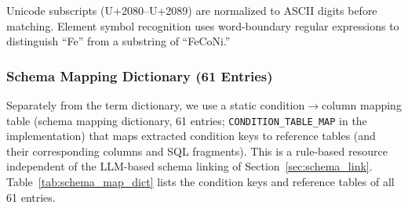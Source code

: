 Unicode subscripts (U+2080--U+2089) are normalized to ASCII digits before matching. Element symbol recognition uses word-boundary regular expressions to distinguish ``Fe'' from a substring of ``FeCoNi.''

\subsubsection{Schema Mapping Dictionary (61 Entries)}
\label{sec:sup_schema_map_dict}

Separately from the term dictionary, we use a static condition$\to$column mapping table (schema mapping dictionary, 61 entries; \texttt{CONDITION\_TABLE\_MAP} in the implementation) that maps extracted condition keys to reference tables (and their corresponding columns and SQL fragments). This is a rule-based resource independent of the LLM-based schema linking of Section~\ref{sec:schema_link}. Table~\ref{tab:schema_map_dict} lists the condition keys and reference tables of all 61 entries.

